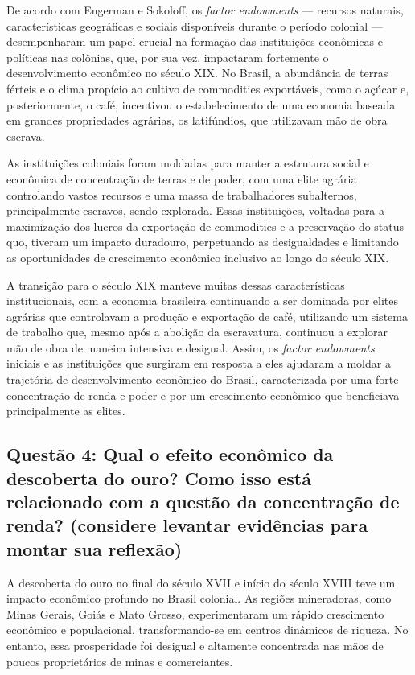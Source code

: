 \documentclass[a4paper,12pt]{article}[abntex2]
\begin{document}
De acordo com Engerman e Sokoloff, os \textit{factor endowments} — recursos naturais, características geográficas e sociais disponíveis durante o período colonial — desempenharam um papel crucial na formação das instituições econômicas e políticas nas colônias, que, por sua vez, impactaram fortemente o desenvolvimento econômico no século XIX. No Brasil, a abundância de terras férteis e o clima propício ao cultivo de commodities exportáveis, como o açúcar e, posteriormente, o café, incentivou o estabelecimento de uma economia baseada em grandes propriedades agrárias, os latifúndios, que utilizavam mão de obra escrava.

As instituições coloniais foram moldadas para manter a estrutura social e econômica de concentração de terras e de poder, com uma elite agrária controlando vastos recursos e uma massa de trabalhadores subalternos, principalmente escravos, sendo explorada. Essas instituições, voltadas para a maximização dos lucros da exportação de commodities e a preservação do status quo, tiveram um impacto duradouro, perpetuando as desigualdades e limitando as oportunidades de crescimento econômico inclusivo ao longo do século XIX.

A transição para o século XIX manteve muitas dessas características institucionais, com a economia brasileira continuando a ser dominada por elites agrárias que controlavam a produção e exportação de café, utilizando um sistema de trabalho que, mesmo após a abolição da escravatura, continuou a explorar mão de obra de maneira intensiva e desigual. Assim, os \textit{factor endowments} iniciais e as instituições que surgiram em resposta a eles ajudaram a moldar a trajetória de desenvolvimento econômico do Brasil, caracterizada por uma forte concentração de renda e poder e por um crescimento econômico que beneficiava principalmente as elites.

\subsection{\textbf{Questão 4: Qual o efeito econômico da descoberta do ouro? Como isso está relacionado com a questão da concentração de renda? (considere levantar evidências para montar sua reflexão)}}

A descoberta do ouro no final do século XVII e início do século XVIII teve um impacto econômico profundo no Brasil colonial. As regiões mineradoras, como Minas Gerais, Goiás e Mato Grosso, experimentaram um rápido crescimento econômico e populacional, transformando-se em centros dinâmicos de riqueza. No entanto, essa prosperidade foi desigual e altamente concentrada nas mãos de poucos proprietários de minas e comerciantes.
\end{document}
